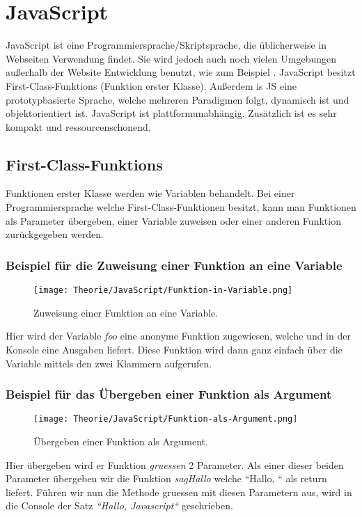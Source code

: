 \section{JavaScript}
\label{js}

JavaScript ist eine Programmiersprache/Skriptsprache, die üblicherweise in Webseiten Verwendung findet. Sie wird jedoch auch noch vielen Umgebungen außerhalb der Website Entwicklung benutzt, 
wie zum Beispiel .
JavaScript besitzt First-Class-Funktions (Funktion erster Klasse). Außerdem is JS eine prototypbasierte Sprache, welche mehreren Paradigmen folgt, dynamisch ist und 
objektorientiert ist. JavaScript ist plattformunabhängig. Zusätzlich ist es sehr kompakt und ressourcenschonend.~\cite{JS}

\subsection{First-Class-Funktions}
Funktionen erster Klasse werden wie Variablen behandelt. Bei einer Programmiersprache welche First-Class-Funktionen besitzt, kann man Funktionen als Parameter übergeben, einer Variable zuweisen oder
einer anderen Funktion zurückgegeben werden.
\pagebreak

\begin{center}
    \subsubsection{Beispiel für die Zuweisung einer Funktion an eine Variable}
\begin{figure}[htbp]
    \centerline{\texttt{[image: Theorie/JavaScript/Funktion-in-Variable.png]}}
    \caption{Zuweisung einer Funktion an eine Variable.~\cite{First-Class-Funktion}}
\end{figure}
\end{center}
Hier wird der Variable \textit{foo} eine anonyme Funktion zugewiesen, welche und in der Konsole eine Ausgaben liefert.
Diese Funktion wird dann ganz einfach über die Variable mittels den zwei Klammern aufgerufen.


\begin{center}
    \subsubsection{Beispiel für das Übergeben einer Funktion als Argument}
\begin{figure}[htbp]
    \centerline{\texttt{[image: Theorie/JavaScript/Funktion-als-Argument.png]}}
    \caption{Übergeben einer Funktion als Argument.~\cite{First-Class-Funktion}}
\end{figure}
\end{center}
Hier übergeben wird er Funktion \textit{gruessen} 2 Parameter. Als einer dieser beiden Parameter übergeben wir die Funktion \textit{sagHallo} welche ``Hallo, `` als return liefert.
Führen wir nun die Methode gruessen mit diesen Parametern aus, wird in die Console der Satz \textit{``Hallo, Javascript``} geschrieben.
\pagebreak


